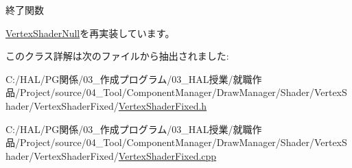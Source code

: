 終了関数 



\mbox{\hyperlink{class_vertex_shader_null_a16334df4ac02db3dd63f042622032301}{Vertex\+Shader\+Null}}を再実装しています。



このクラス詳解は次のファイルから抽出されました\+:\begin{DoxyCompactItemize}
\item 
C\+:/\+H\+A\+L/\+P\+G関係/03\+\_\+作成プログラム/03\+\_\+\+H\+A\+L授業/就職作品/\+Project/source/04\+\_\+\+Tool/\+Component\+Manager/\+Draw\+Manager/\+Shader/\+Vertex\+Shader/\+Vertex\+Shader\+Fixed/\mbox{\hyperlink{_vertex_shader_fixed_8h}{Vertex\+Shader\+Fixed.\+h}}\item 
C\+:/\+H\+A\+L/\+P\+G関係/03\+\_\+作成プログラム/03\+\_\+\+H\+A\+L授業/就職作品/\+Project/source/04\+\_\+\+Tool/\+Component\+Manager/\+Draw\+Manager/\+Shader/\+Vertex\+Shader/\+Vertex\+Shader\+Fixed/\mbox{\hyperlink{_vertex_shader_fixed_8cpp}{Vertex\+Shader\+Fixed.\+cpp}}\end{DoxyCompactItemize}
